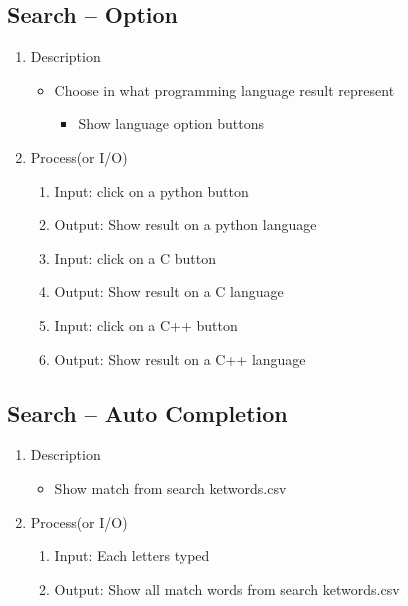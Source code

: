 \documentclass[conference]{IEEEtran}
\begin{document}
\subsection{Search – Option}
\begin{enumerate}
\item Description
\begin{itemize}
  \item Choose in what programming language result represent
  \begin{itemize}
     \item Show language option buttons
  \end{itemize}
\end{itemize}
\item Process(or I/O)
  \begin{enumerate}
    \item Input: click on a python button 
    \item Output: Show result on a python language 
    \item Input: click on a C button 
    \item Output: Show result on a C language 
    \item Input: click on a C++ button 
    \item Output: Show result on a C++ language 
  \end{enumerate}
\end{enumerate}
\textit{}

\subsection{Search – Auto Completion}
\begin{enumerate}
\item Description
\begin{itemize}
  \item Show match from search ketwords.csv
\end{itemize}
\item Process(or I/O)
  \begin{enumerate}
     \item Input: Each letters typed
    \item Output: Show all match words from search ketwords.csv
  \end{enumerate}
\end{enumerate}
\textit{}
\end{document}
